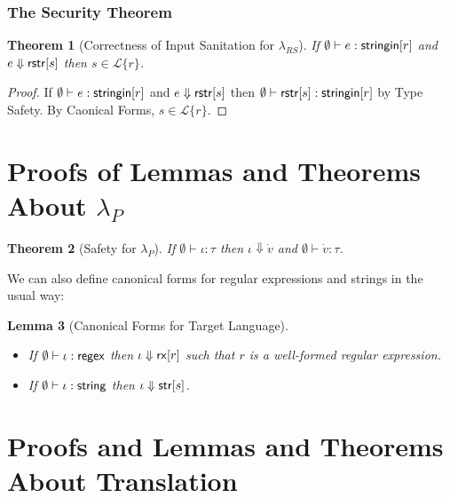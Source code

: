 \documentclass[11pt,leqno]{article}
\newtheorem{thm}{Theorem}
\newtheorem{lem}[thm]{Lemma}
\theoremstyle{definition}
\newcommand{\Lagr}{\mathcal{L}}
\newcommand{\lang}[1]{\Lagr\{#1\}}
\newcommand{\lambdas}{\lambda_{RS}}
\newcommand{\lambdap}{\lambda_P}
\newcommand{\stringin}[1]{{\sf stringin}[#1]}
\renewcommand{\tstr}[1]{{{\sf str}[#1]}}
\newcommand{\rx}[1]{ {\sf rx}[#1] }
\newcommand{\str}{{\sf string}}
\newcommand{\regex}{{\sf regex}}
\newcommand{\treduces}{ \Downarrow }
\newcommand{\sreduces}{ \Downarrow }
\begin{document}
\subsubsection{The Security Theorem}\label{sec:securitythm}

\begin{thm}[Correctness of Input Sanitation for $\lambdas$]\label{thm:scorrect}
  If  $\emptyset \vdash e : \stringin{r}$ and $e \sreduces \rstr{s}$ then $s \in \lang{r}$.
\end{thm}
\begin{proof}
If $\emptyset \vdash e : \stringin{r}$ and $e \sreduces \rstr{s}$ then $\emptyset \vdash \rstr{s} : \stringin{r}$ by Type Safety.
By Caonical Forms, $s \in \lang{r}$.
\end{proof}



\section{Proofs of Lemmas and Theorems About $\lambdap$}


\begin{thm}[Safety for $\lambdap$] If $\emptyset \vdash \iota : \tau$ 
  then $\iota \sreduces \dot v$ and $\emptyset \vdash \dot v : \tau$.
\end{thm}

We can also define canonical forms for regular expressions and strings in the usual way:


\begin{lem}[Canonical Forms for Target Language]
~
\begin{itemize}
\item 
If $\emptyset \vdash \iota : \regex$ then $\iota \treduces \rx{r}$ such that $r$ is a well-formed regular expression. 
\item 
If $\emptyset \vdash \iota : \str$ then $\iota \treduces \tstr{s}$.
\end{itemize}
\end{lem}


\section{Proofs and Lemmas and Theorems About Translation}
\end{document}
